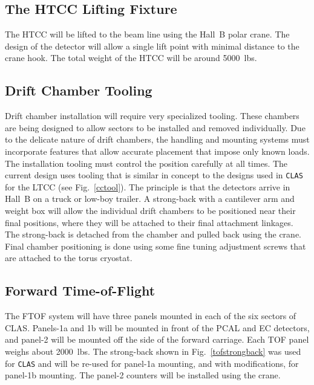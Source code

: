 \subsection{The HTCC Lifting Fixture}

The HTCC will be lifted to the beam line using the Hall~B polar crane.
The design of the detector will allow a single lift point with
minimal distance to the crane hook.  The total weight of the HTCC will
be around 5000~lbs. 

\subsection{Drift Chamber Tooling}

Drift chamber installation will require very specialized tooling.  These 
chambers are being designed to allow sectors to be installed and removed 
individually.  Due to the delicate nature of drift chambers, the handling 
and mounting systems must incorporate features that allow accurate placement
that impose only known loads.  The installation tooling must control the 
position carefully at all times.  The current design uses tooling that is 
similar in concept to the designs used in {\tt CLAS} for the LTCC (see
Fig.~\ref{cctool}).  The principle is that the detectors arrive in Hall~B 
on a truck or low-boy trailer.  A strong-back with a cantilever arm and
weight box will allow the individual drift chambers to be positioned near
their final positions, where they will be attached to their final
attachment linkages.  The strong-back is detached from the chamber and pulled 
back using the crane.  Final chamber positioning is done using some fine 
tuning adjustment screws that are attached to the torus cryostat.  

\subsection{Forward Time-of-Flight}

The FTOF system will have three panels mounted in each of the six
sectors of CLAS.  Panels-1a and 1b will be mounted in front of the 
PCAL and EC detectors, and panel-2 will be mounted off the side of the 
forward carriage.  Each TOF panel weighs about 2000~lbs.  The strong-back 
shown in Fig.~\ref{tofstrongback} was used for {\tt CLAS} and will be 
re-used for panel-1a mounting, and with modifications, for panel-1b 
mounting.  The panel-2 counters will be installed using the crane.

